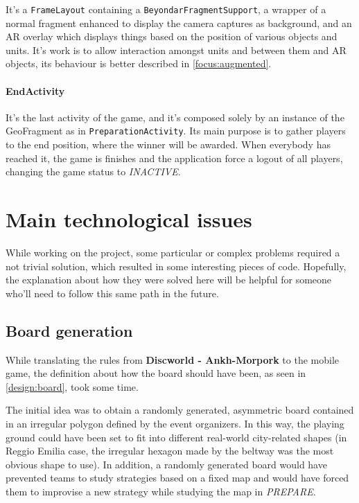 		It's a \lstinline|FrameLayout| containing a \lstinline|BeyondarFragmentSupport|, a wrapper of a normal fragment enhanced to display the camera captures as background, and an AR overlay which displays things based on the position of various objects and units.
		It's work is to allow interaction amongst units and between them and AR objects, its behaviour is better described in \autoref{focus:augmented}.
		
		\paragraph{EndActivity}
	
		It's the last activity of the game, and it's composed solely by an instance of the GeoFragment as in \lstinline|PreparationActivity|.
		Its main purpose is to gather players to the end position, where the winner will be awarded. When everybody has reached it, the game is finishes and the application force a logout of all players, changing the game status to \emph{INACTIVE}.
	
	\section{Main technological issues}\label{focus:general}
		
		While working on the project, some particular or complex problems required a not trivial solution, which resulted in some interesting pieces of code.
		Hopefully, the explanation about how they were solved here will be helpful for someone who'll need to follow this same path in the future.
		
		\subsection{Board generation}\label{focus:board}
		
			While translating the rules from \textbf{Discworld - Ankh-Morpork} to the mobile game, the definition about how the board should have been, as seen in \autoref{design:board}, took some time.
			
			The initial idea was to obtain a randomly generated, asymmetric board contained in an irregular polygon defined by the event organizers.
			In this way, the playing ground could have been set to fit into different real-world city-related shapes (in Reggio Emilia case, the irregular hexagon made by the beltway was the most obvious shape to use).
			In addition, a randomly generated board would have prevented teams to study strategies based on a fixed map and would have forced them to improvise a new strategy while studying the map in \emph{PREPARE}.
			
